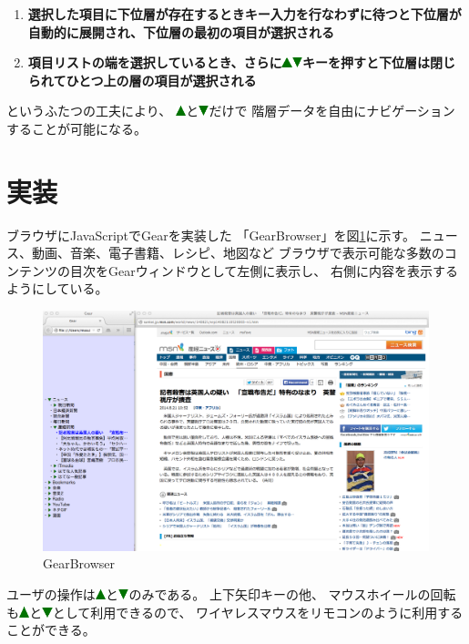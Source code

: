 \documentclass[twoside]{wiss}
\def\GEAR{\textsf{Gear}}
\def\GB{\textsf{GearBrowser}}
\def\uptriangle{\includegraphics[width=3mm,bb=0 0 36 36]{figures/uptriangle.pdf}}
\def\downtriangle{\includegraphics[width=3mm,bb=0 0 36 36]{figures/downtriangle.pdf}}
\begin{document}
\begin{enumerate}
\item \textbf{選択した項目に下位層が存在するときキー入力を行なわずに待つと下位層が自動的に展開され、下位層の最初の項目が選択される}
\item \textbf{項目リストの端を選択しているとき、さらに{\uptriangle}{\downtriangle}キーを押すと下位層は閉じられてひとつ上の層の項目が選択される}
\end{enumerate}

\noindent
というふたつの工夫により、
{\uptriangle}と{\downtriangle}だけで
階層データを自由にナビゲーションすることが可能になる。

\section{実装}

ブラウザにJavaScriptで{\GEAR}を実装した
「{\GB}」を図\ref{gearbrowser}に示す。
ニュース、動画、音楽、電子書籍、レシピ、地図など
ブラウザで表示可能な多数のコンテンツの目次を{\GEAR}ウィンドウとして左側に表示し、
右側に内容を表示するようにしている。

\begin{figure}
\centerline{\includegraphics[width=140mm,bb=0 0 1401 872]{figures/ab4ff7c2d44f4af2bb94fae76589f495.png}}
\caption{\textsf{GearBrowser}}
\label{gearbrowser}
\end{figure}

ユーザの操作は{\uptriangle}と{\downtriangle}のみである。
上下矢印キーの他、
マウスホイールの回転も{\uptriangle}と{\downtriangle}として利用できるので、
ワイヤレスマウスをリモコンのように利用することができる。

\end{document}
